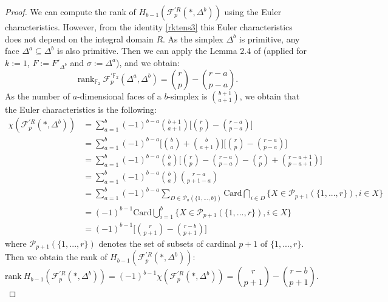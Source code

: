 \documentclass{article}
\begin{document}
\begin{proof}
    We can compute the rank of $H_{b-1}(\mathcal{F}_p^{'R}(*,\Delta^b))$ using the Euler characteristics. However, from the identity \ref{rktens3} this Euler characteristics does not depend on the integral domain $R$. As the simplex $\Delta^b$ is primitive, any face $\Delta^a\subseteq \Delta^b$ is also primitive. Then we can apply the Lemma 2.4 of \cite{BMR 2024} (applied for $k:=1$, $F:=F'_{\Delta^b}$ and $\sigma:=\Delta^a$), and we obtain:
    \begin{equation*}
        \mathrm{rank}_{\mathbb{F}_2}~\mathcal{F}^{'\mathbb{F}_2}_p(\Delta^a,\Delta^b)=\binom{r}{p}-\binom{r-a}{p-a}.
    \end{equation*}
    As the number of $a$-dimensional faces of a $b$-simplex is $\binom{b+1}{a+1}$, we obtain that the Euler characteristics is the following:
    \begin{align*}
        \chi(\mathcal{F}_p^{'R}(*,\Delta^b)) &= \sum_{a=1}^b(-1)^{b-a}\binom{b+1}{a+1}\Bigg[\binom{r}{p}-\binom{r-a}{p-a}\Bigg] \\
        & =\sum_{a=1}^b(-1)^{b-a}\Bigg [ \binom{b}{a}+\binom{b}{a+1} \Bigg]\Bigg[\binom{r}{p}-\binom{r-a}{p-a}\Bigg] \\
        &=\sum_{a=1}^b(-1)^{b-a}\binom{b}{a}\Bigg[\binom{r}{p}-\binom{r-a}{p-a}-\binom{r}{p}+\binom{r-a+1}{p-a+1}\Bigg]
        \\ &=\sum_{a=1}^b(-1)^{b-a}\binom{b}{a}\binom{r-a}{p+1-a}
        \\ & =\sum_{a=1}^b (-1)^{b-a}\sum_{D\in \mathcal{P}_{a}(\{1,...,b\})}\mathrm{Card}\bigcap_{i\in D} \{X \in \mathcal{P}_{p+1}(\{1,...,r\}),i\in X\}
        \\ & = (-1)^{b-1} \mathrm{Card} \bigcup_{i=1}^b \{X \in \mathcal{P}_{p+1}(\{1,...,r\}),i\in X\}
        \\& =(-1)^{b-1}\Bigg[\binom{r}{p+1}-\binom{r-b}{p+1}\Bigg]
    \end{align*}
    where $\mathcal{P}_{p+1}(\{1,...,r\})$ denotes the set of subsets of cardinal $p+1$ of $\{1,...,r\}$. Then we obtain the rank of $H_{b-1}(\mathcal{F}_p^{'R}(*,\Delta^b))$:
    \begin{equation*}
        \mathrm{rank}~H_{b-1}(\mathcal{F}_p^{'R}(*,\Delta^b)) = (-1)^{b-1}\chi(\mathcal{F}_p^{'R}(*,\Delta^b)) = \binom{r}{p+1}-\binom{r-b}{p+1}.
    \end{equation*}
        

\end{proof}
\end{document}
